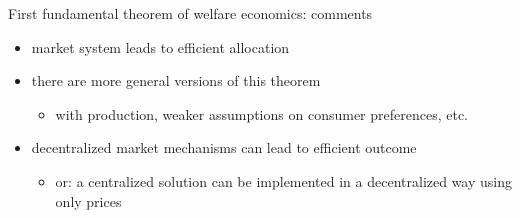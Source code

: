 \documentclass[bigger]{beamer}
\begin{document}
\begin{frame}[label={sec:orgd538388}]{First fundamental  theorem of welfare economics: comments}
\begin{itemize}
\item market system leads to efficient allocation
\item there are more general versions of this theorem
\begin{itemize}
\item with production, weaker assumptions on consumer preferences, etc.
\end{itemize}
\item decentralized market mechanisms can lead to efficient outcome
\begin{itemize}
\item or: a centralized solution can be implemented in a decentralized way using only prices
\end{itemize}
\end{itemize}
\end{frame}
\end{document}
